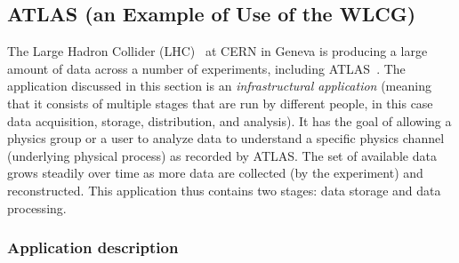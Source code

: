%
%
%
%
%
%

\subsection{ATLAS (an Example of Use of the WLCG) \label{WLCGSteve}}

%



The Large Hadron Collider (LHC)~\cite{lhc} at CERN in Geneva is
producing a large amount of data across a number of experiments,
including ATLAS~\cite{atlas}. The application discussed in this
section is an {\em infrastructural application} (meaning that it
consists of multiple stages that are run by different people, in this
case data acquisition, storage, distribution, and analysis). It has
the goal of allowing a physics group or a user to analyze data to
understand a specific physics channel (underlying physical process) as
recorded by ATLAS.  The set of available data grows steadily over time
as more data are collected (by the experiment) and reconstructed. This
application thus contains two stages: data storage and data
processing.

\subsubsection*{Application description}


